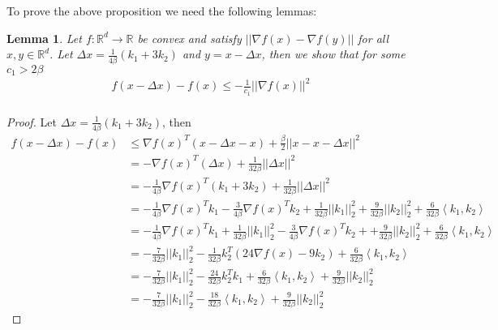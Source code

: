\documentclass[12pt,twoside]{article}
\newtheorem{lemma}{Lemma}
\begin{document}
To prove the above proposition we need the following lemmas:
\begin{lemma}
Let $f : \mathbb{R}^d \rightarrow \mathbb{R}$  be convex and satisfy $|| \nabla f(x) - \nabla f(y) ||$ for all $x,y \in \mathbb{R}^d$. Let $\Delta x =  \frac{1}{4\beta}(k_1 + 3k_2)$ and $ y  = x - \Delta x$, then  we show that for some $c_1 > 2\beta $
\begin{align}
f(x - \Delta x ) - f(x) \leq - \frac{1}{c_1} || \nabla f(x) ||^2 \\
\end{align}
\end{lemma}
\begin{proof}
Let $\Delta x =  \frac{1}{4\beta}(k_1 + 3k_2)$, then 
\begin{equation} 
\begin{aligned}\label{ineq0}
f(x - \Delta x) - f(x) &\leq \nabla f(x)^T (x - \Delta x - x) + \frac{\beta}{2} || x - x - \Delta x ||^2 \\
&= -  \nabla f(x)^T ( \Delta x) + \frac{1}{32 \beta} || \Delta x ||^2 \\
&= -\frac{1}{4 \beta} \nabla  f(x)^T ( k_1 + 3k_2) + \frac{1}{32 \beta} || \Delta x ||^2 \\
&= -\frac{1}{4\beta}\nabla f(x)^T k_1 - \frac{3}{4\beta}\nabla f(x)^T k_2 + \frac{1}{32 \beta} || k_1 ||_2^2 + \frac{9}{32 \beta} || k_2 ||^2_2 + \frac{6}{32\beta}\left\langle k_1, k_2 \right\rangle \\
&= -\frac{1}{4\beta}\nabla f(x)^T k_1 +  \frac{1}{32 \beta} || k_1 ||_2^2 -  \frac{3}{4\beta}\nabla f(x)^T k_2 +  + \frac{9}{32 \beta} || k_2 ||^2_2  + \frac{6}{32\beta}\left\langle k_1, k_2 \right\rangle \\
&= -\frac{7}{32 \beta}|| k_1 ||_2^2 -\frac{1}{32 \beta}k_2^T(24 \nabla f(x) - 9 k_2) + \frac{6}{32\beta}\left\langle k_1, k_2 \right\rangle \\
&= -\frac{7}{32 \beta}|| k_1 ||_2^2 - \frac{24}{32 \beta}k_2^Tk_1 + \frac{6}{32 \beta}\left\langle k_1, k_2 \right\rangle + \frac{9}{32\beta}|| k_2 ||_2^2 \\
&= -\frac{7}{32 \beta}|| k_1 ||_2^2 - \frac{18}{32 \beta} \left\langle k_1, k_2 \right\rangle + \frac{9}{32 \beta}|| k_2 ||_2^2
\end{aligned}
\end{equation}


\end{proof}
\end{document}
